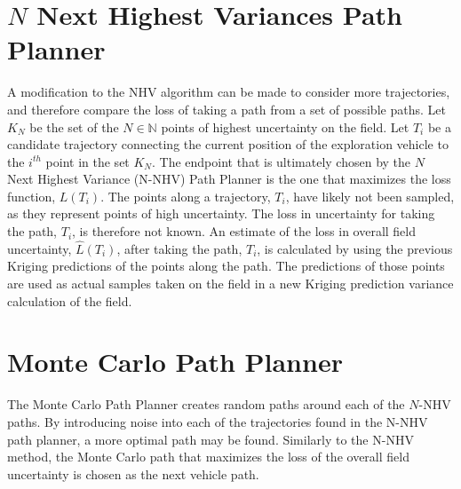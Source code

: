 \section{$N$ Next Highest Variances Path Planner} \label{sec:nnhv}
A modification to the NHV algorithm can be made to consider more trajectories, and therefore compare the loss of taking a path from a set of possible paths. Let $K_N$ be the set of the $N \in \mathbb{N}$ points of highest uncertainty on the field. Let $T_i$ be a candidate trajectory connecting the current position of the exploration vehicle to the $i^{th}$ point in the set $K_N$. The endpoint that is ultimately chosen by the $N$ Next Highest Variance (N-NHV) Path Planner is the one that maximizes the loss function, $L(T_i)$. The points along a trajectory, $T_i$, have likely not been sampled, as they represent points of high uncertainty. The loss in uncertainty for taking the path, $T_i$, is therefore not known. An estimate of the loss in overall field uncertainty, $\hat{L}(T_i)$, after taking the path, $T_i$, is calculated by using the previous Kriging predictions of the points along the path. The predictions of those points are used as actual samples taken on the field in a new Kriging prediction variance calculation of the field.


\section{Monte Carlo Path Planner} \label{sec:mcpp}
The Monte Carlo Path Planner creates random paths around each of the $N$-NHV paths. By introducing noise into each of the trajectories found in the N-NHV path planner, a more optimal path may be found. Similarly to the N-NHV method, the Monte Carlo path that maximizes the loss of the overall field uncertainty is chosen as the next vehicle path.


